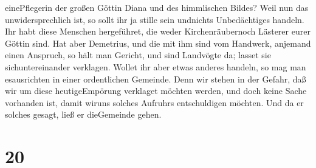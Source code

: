 einePflegerin der großen Göttin Diana und des himmlischen Bildes?
 Weil nun das unwidersprechlich ist, so sollt ihr ja stille
sein undnichts Unbedächtiges handeln.  Ihr habt diese
Menschen hergeführet, die weder Kirchenräubernoch Lästerer eurer Göttin
sind.  Hat aber Demetrius, und die mit ihm sind vom
Handwerk, anjemand einen Anspruch, so hält man Gericht, und sind
Landvögte da; lasset sie sichuntereinander verklagen. 
Wollet ihr aber etwas anderes handeln, so mag man esausrichten in einer
ordentlichen Gemeinde.  Denn wir stehen in der Gefahr, daß
wir um diese heutigeEmpörung verklaget möchten werden, und doch keine
Sache vorhanden ist, damit wiruns solches Aufruhrs entschuldigen
möchten. Und da er solches gesagt, ließ er dieGemeinde gehen.

\hypertarget{section-19}{%
\section{20}\label{section-19}}

